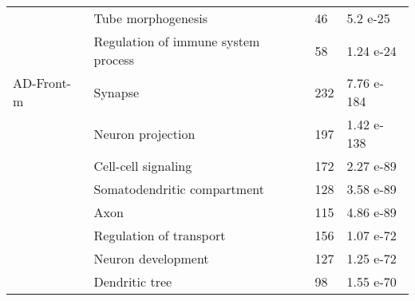 \begin{table}[!ht]
\begin{tabularx}{13cm}{L{2cm}L{4.5cm}L{3cm}C{1.5cm}}
                      & Tube morphogenesis                          & 46  & 5.2 e-25   \\
                      & Regulation of immune system process         & 58  & 1.24 e-24  \\
AD-Front-m            & Synapse                                       & 232 & 7.76 e-184 \\
                      & Neuron projection                           & 197 & 1.42 e-138 \\
                      & Cell-cell signaling                         & 172 & 2.27 e-89  \\
                      & Somatodendritic compartment                 & 128 & 3.58 e-89  \\
                      & Axon                                          & 115 & 4.86 e-89  \\
                      & Regulation of transport                     & 156 & 1.07 e-72  \\
                      & Neuron development                          & 127 & 1.25 e-72  \\
                      & Dendritic tree                              & 98  & 1.55 e-70  \\
\bottomrule
\end{tabularx}
\end{table}


